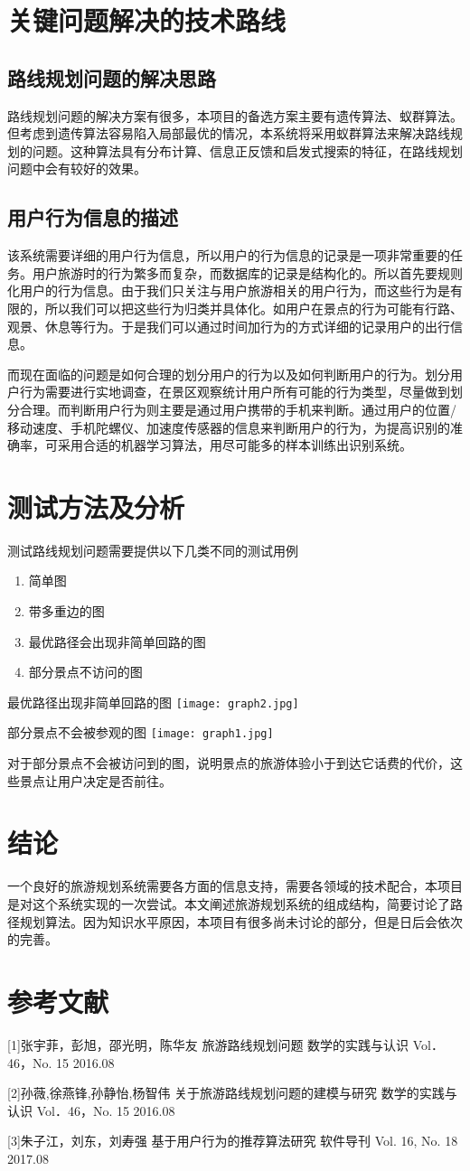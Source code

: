 \documentclass[titlepage]{article}
\begin{document}
\section{关键问题解决的技术路线}
\subsection{路线规划问题的解决思路}
路线规划问题的解决方案有很多，本项目的备选方案主要有遗传算法、蚁群算法。但考虑到遗传算法容易陷入局部最优的情况，本系统将采用蚁群算法来解决路线规划的问题。这种算法具有分布计算、信息正反馈和启发式搜索的特征，在路线规划问题中会有较好的效果。
\subsection{用户行为信息的描述}
该系统需要详细的用户行为信息，所以用户的行为信息的记录是一项非常重要的任务。用户旅游时的行为繁多而复杂，而数据库的记录是结构化的。所以首先要规则化用户的行为信息。由于我们只关注与用户旅游相关的用户行为，而这些行为是有限的，所以我们可以把这些行为归类并具体化。如用户在景点的行为可能有行路、观景、休息等行为。于是我们可以通过时间加行为的方式详细的记录用户的出行信息。

而现在面临的问题是如何合理的划分用户的行为以及如何判断用户的行为。划分用户行为需要进行实地调查，在景区观察统计用户所有可能的行为类型，尽量做到划分合理。而判断用户行为则主要是通过用户携带的手机来判断。通过用户的位置/移动速度、手机陀螺仪、加速度传感器的信息来判断用户的行为，为提高识别的准确率，可采用合适的机器学习算法，用尽可能多的样本训练出识别系统。
\section{测试方法及分析}
测试路线规划问题需要提供以下几类不同的测试用例
\begin{enumerate}
\item 简单图
\item 带多重边的图
\item 最优路径会出现非简单回路的图
\item 部分景点不访问的图
\end{enumerate}

最优路径出现非简单回路的图
\texttt{[image: graph2.jpg]}

部分景点不会被参观的图
\texttt{[image: graph1.jpg]}

对于部分景点不会被访问到的图，说明景点的旅游体验小于到达它话费的代价，这些景点让用户决定是否前往。
\section{结论}
一个良好的旅游规划系统需要各方面的信息支持，需要各领域的技术配合，本项目是对这个系统实现的一次尝试。本文阐述旅游规划系统的组成结构，简要讨论了路径规划算法。因为知识水平原因，本项目有很多尚未讨论的部分，但是日后会依次的完善。
\section*{参考文献}
[1]张宇菲，彭旭，邵光明，陈华友  \quad 旅游路线规划问题 \quad  数学的实践与认识 Vol．46，No. 15 2016.08

[2]孙薇,徐燕锋,孙静怡,杨智伟 \quad 关于旅游路线规划问题的建模与研究 \quad  数学的实践与认识 Vol．46，No. 15 2016.08

[3]朱子江，刘东，刘寿强 \quad 基于用户行为的推荐算法研究 \quad  软件导刊 Vol. 16, No. 18 2017.08
\end{document}
